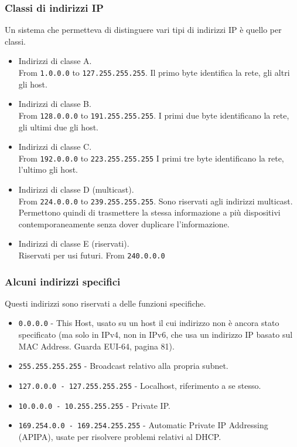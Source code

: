 \subsubsection{Classi di indirizzi IP}
Un sistema che permetteva di distinguere vari tipi di indirizzi IP è quello per classi.
\begin{itemize}
	\item Indirizzi di classe A.\\
	From \verb|1.0.0.0| to \verb|127.255.255.255|.
	Il primo byte identifica la rete, gli altri gli host.
	\item Indirizzi di classe B.\\
	From \verb|128.0.0.0| to \verb|191.255.255.255|.
	I primi due byte identificano la rete, gli ultimi due gli host.
	\item Indirizzi di classe C.\\
	From \verb|192.0.0.0| to \verb|223.255.255.255|
	I primi tre byte identificano la rete, l'ultimo gli host.
	\item Indirizzi di classe D (multicast).\\
	From \verb|224.0.0.0| to \verb|239.255.255.255|. Sono riservati agli indirizzi multicast. Permettono quindi di trasmettere la stessa informazione a più dispositivi contemporaneamente senza dover duplicare l'informazione.
	\item Indirizzi di classe E (riservati).\\
	Riservati per usi futuri.
	From \verb|240.0.0.0|
\end{itemize}

\subsubsection{Alcuni indirizzi specifici}
Questi indirizzi sono riservati a delle funzioni specifiche.
\begin{itemize}
	\item \verb|0.0.0.0| - This Host, usato su un host il cui indirizzo non è ancora stato specificato (ma solo in IPv4, non in IPv6, che usa un indirizzo IP basato sul MAC Address. Guarda EUI-64, pagina 81).
	\item \verb|255.255.255.255| - Broadcast relativo alla propria subnet.
	\item \verb|127.0.0.0 - 127.255.255.255| - Localhost, riferimento a se stesso.
	\item \verb|10.0.0.0 - 10.255.255.255| - Private IP.
	\item \verb|169.254.0.0 - 169.254.255.255| - Automatic Private IP Addressing (APIPA), usate per risolvere problemi relativi al DHCP.
\end{itemize}

